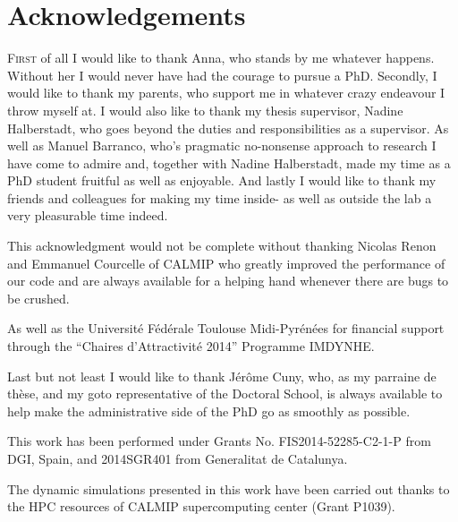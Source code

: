 \chapter{Acknowledgements}
	
	\lettrine[lines=4]{\color{activeColor}F}{irst} of all I would like to thank Anna, who stands by me whatever happens. Without her I would never have had the courage to pursue a PhD.
	Secondly, I would like to thank my parents, who support me in whatever crazy endeavour I throw myself at. 
	I would also like to thank my thesis supervisor, Nadine Halberstadt, who goes beyond the duties and responsibilities as a supervisor. As well as Manuel Barranco, who's pragmatic no-nonsense approach to research I have come to admire and, together with Nadine Halberstadt, made my time as a PhD student fruitful as well as enjoyable.
	And lastly I would like to thank my friends and colleagues for making my time inside- as well as outside the lab a very pleasurable time indeed.
	
	This acknowledgment would not be complete without thanking Nicolas Renon and Emmanuel Courcelle of CALMIP who greatly improved the performance of our code and are always available for a helping hand whenever there are bugs to be crushed.
	
	As well as the Universit\'e F\'ed\'erale Toulouse Midi-Pyr\'en\'ees for financial support through the ``Chaires d'Attractivit\'e 2014'' Programme IMDYNHE.
	
	Last but not least I would like to thank Jérôme Cuny, who, as my parraine de thèse, and my goto representative of the Doctoral School, is always available to help make the administrative side of the PhD go as smoothly as possible.  
	
	This work has been performed under Grants No. FIS2014-52285-C2-1-P from DGI, Spain, and  2014SGR401 from Generalitat de Catalunya.

	The dynamic simulations presented in this work have been carried out thanks to the HPC resources of CALMIP supercomputing center (Grant P1039).

\clearpage{\pagestyle{empty}\cleardoublepage}
